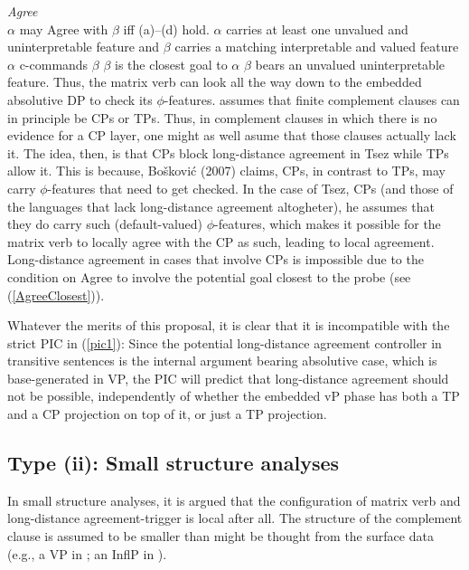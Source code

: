 \documentclass[output=paper
,modfonts
,nonflat]{langsci/langscibook}
\begin{document}
	\ea\label{ex:mueller:7} \label{Agree}{\itshape Agree} \\ $\alpha$ may Agree with $\beta$ iff
	(a)--(d) hold.
	\ea  $\alpha$ carries at least one unvalued and uninterpretable
	feature and $\beta$ carries a matching interpretable and valued
	feature 
	\ex  $\alpha$ c-commands $\beta$
	\ex \label{AgreeClosest}$\beta$ is the closest goal to $\alpha$
	\ex \label{boerj:AC}$\beta$ bears an unvalued uninterpretable feature.
	\z
	\z
	Thus, the matrix verb can look all the way
	down to the embedded absolutive DP to check its
	$\phi$-features. \citet{Boskovic:07} assumes that finite complement
	clauses can in principle be CPs or TPs. Thus, in complement clauses in
	which there is no evidence for a CP layer, one might as well asume
	that those clauses actually lack it.
	The idea, then, is that CPs block long-distance agreement in Tsez while TPs allow it. This
	is because, Bo\v{s}kovi{\'c} (2007) claims, CPs, in contrast to TPs,
	may carry $\phi$-features that need to get checked. In the case of Tsez,
	CPs (and those of the languages that lack long-distance agreement altogheter), he assumes
	that they do carry such (default-valued) $\phi$-features, which makes it possible for
	the matrix verb to locally agree with the CP as such, leading to local
	agreement. Long-distance agreement in cases that involve CPs is impossible due to the
	condition on Agree to involve the potential goal closest to the probe
	(see (\ref{AgreeClosest})).
	
	Whatever the merits of this proposal, it is clear that it is
	incompatible with the strict PIC in (\ref{pic1}): 
	Since the potential long-distance agreement controller  in
	transitive sentences is the internal argument bearing absolutive case, which is base-generated
	in VP, the PIC will predict that long-distance agreement should not be
	possible, independently of whether the embedded vP phase has both a TP
	and a CP projection on top of it, or just a TP projection. 
	
	\subsection{Type (ii): Small structure analyses}
	
	In small structure analyses, it is argued that the configuration of matrix verb
	and long-distance agree\-ment-trigger is local after all. The structure
	of the complement clause is assumed to be smaller than might be
	thought from the surface data (e.g., a VP in \citealt{Boeckx:04}; an
	InflP in \citealt{Bhatt:05}).
	
\end{document}
